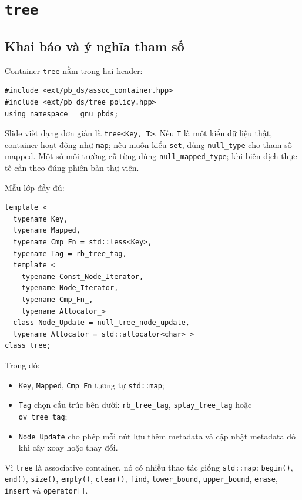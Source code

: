 \documentclass[11pt]{article}
\begin{document}
\section{\texorpdfstring{\texttt{tree}}{tree}}

\subsection{Khai báo và ý nghĩa tham số}

Container \texttt{tree} nằm trong hai header:

\begin{verbatim}
#include <ext/pb_ds/assoc_container.hpp>
#include <ext/pb_ds/tree_policy.hpp>
using namespace __gnu_pbds;
\end{verbatim}

Slide viết dạng đơn giản là \texttt{tree<Key, T>}. Nếu \texttt{T} là một kiểu
dữ liệu thật, container hoạt động như \texttt{map}; nếu muốn kiểu
\texttt{set}, dùng \texttt{null\_type} cho tham số mapped. Một số môi trường
cũ từng dùng \texttt{null\_mapped\_type}; khi biên dịch thực tế cần theo đúng
phiên bản thư viện.

Mẫu lớp đầy đủ:

\begingroup
\small
\begin{verbatim}
template <
  typename Key,
  typename Mapped,
  typename Cmp_Fn = std::less<Key>,
  typename Tag = rb_tree_tag,
  template <
    typename Const_Node_Iterator,
    typename Node_Iterator,
    typename Cmp_Fn_,
    typename Allocator_>
  class Node_Update = null_tree_node_update,
  typename Allocator = std::allocator<char> >
class tree;
\end{verbatim}
\endgroup

Trong đó:
\begin{itemize}
  \item \texttt{Key}, \texttt{Mapped}, \texttt{Cmp\_Fn} tương tự
  \texttt{std::map};
  \item \texttt{Tag} chọn cấu trúc bên dưới: \texttt{rb\_tree\_tag},
  \texttt{splay\_tree\_tag} hoặc \texttt{ov\_tree\_tag};
  \item \texttt{Node\_Update} cho phép mỗi nút lưu thêm metadata và cập nhật
  metadata đó khi cây xoay hoặc thay đổi.
\end{itemize}

Vì \texttt{tree} là associative container, nó có nhiều thao tác giống
\texttt{std::map}: \texttt{begin()}, \texttt{end()}, \texttt{size()},
\texttt{empty()}, \texttt{clear()}, \texttt{find}, \texttt{lower\_bound},
\texttt{upper\_bound}, \texttt{erase}, \texttt{insert} và
\texttt{operator[]}.
\end{document}
